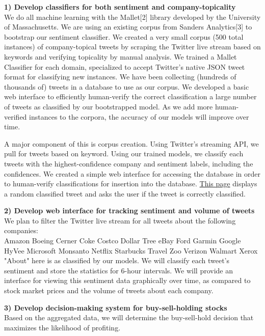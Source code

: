 \documentclass[letterpaper]{article}
\begin{document}
\textbf{1) Develop classifiers for both sentiment and company-topicality} \\
We do all machine learning with the Mallet[2] library developed by the University of Massachusetts. We are using an existing corpus from Sanders Analytics[3] to bootstrap our sentiment classifier. We created a very small corpus (500 total instances) of company-topical tweets by scraping the Twitter live stream based on keywords and verifying topicality by manual analysis. We trained a Mallet Classifier for each domain, specialized to accept Twitter's native JSON tweet format for classifying new instances. We have been collecting (hundreds of thousands of) tweets in a database to use as our corpus. We developed a basic web interface to efficiently human-verify the correct classification a large number of tweets as classified by our bootstrapped model. As we add more human-verified instances to the corpora, the accuracy of our models will improve over time.

A major component of this is corpus creation. Using Twitter's streaming API, we pull for tweets based on keyword. Using our trained models, we classify each tweets with the highest-confidence company and sentiment labels, including the confidences. We created a simple web interface for accessing the database in order to human-verify classifications for insertion into the database. \href{http://danielstiner.com:9001/company-yes-no.html#/classified/random/company/confidence/.2:1/count/1}{This page} displays a random classified tweet and asks the user if the tweet is correctly classified.

\textbf{2) Develop web interface for tracking sentiment and volume of tweets} \\
We plan to filter the Twitter live stream for all tweets about the following companies: \\

Amazon Boeing Cerner Coke Costco Dollar Tree eBay Ford Garmin Google HyVee Microsoft Monsanto Netflix Starbucks Travel Zoo Verizon Walmart Xerox \\

"About" here is as classified by our models. We will classify each tweet's sentiment and store the statistics for 6-hour intervals. We will provide an interface for viewing this sentiment data graphically over time, as compared to stock market prices and the volume of tweets about each company.

\textbf{3) Develop decision-making system for buy-sell-holding stocks}\\
Based on the aggregated data, we will determine the buy-sell-hold decision that maximizes the likelihood of profiting.
\end{document}
